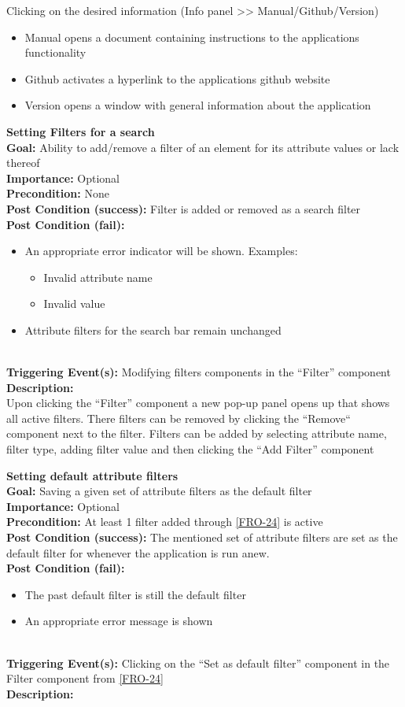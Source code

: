 \documentclass[10pt,a4paper]{report}
\newcommand{\precondition}[1]{
    \textbf{Precondition: } #1 \leavevmode \\
}
\newcommand{\FRDescription}[8]{
    \textbf{#1} \leavevmode \\
    \textbf{Goal: } #2 \leavevmode \\
    \textbf{Importance: } #3 \leavevmode \\
    \precondition{#4}
    \textbf{Post Condition (success): } #5 \leavevmode \\
    \textbf{Post Condition (fail): } #6 \leavevmode \\
    \textbf{Triggering Event(s): } #7 \leavevmode \\
    \textbf{Description: } \leavevmode \\ 
    #8}
\newcommand{\FRODescription}[8]{
    \textbf{#1} \leavevmode \\
    \textbf{Goal: } #2 \leavevmode \\
    \textbf{Importance: } #3 \leavevmode \\
    \precondition{#4}
    \textbf{Post Condition (success): } #5 \leavevmode \\
    \textbf{Post Condition (fail): } #6 \leavevmode \\
    \textbf{Triggering Event(s): } #7 \leavevmode \\
    \textbf{Description: } \leavevmode \\
    #8}
\begin{document}
\begin{FRO}
    {Clicking on the desired information (Info panel >> Manual/Github/Version)}
    {\begin{itemize}
        \item Manual opens a document containing instructions to the applications functionality
        \item Github activates a hyperlink to the applications github website
        \item Version opens a window with general information about the application
    \end{itemize}}
    \item \FRDescription{Setting Filters for a search}
    {Ability to add/remove a filter of an element for its attribute values or lack thereof}
    {Optional}
    {None}
    {Filter is added or removed as a search filter}
    {\begin{itemize}
        \item An appropriate error indicator will be shown. Examples:
        \begin{itemize}
            \item Invalid attribute name
            \item Invalid value
        \end{itemize}
        \item Attribute filters for the search bar remain unchanged
    \end{itemize}}
    {Modifying filters components in the “Filter” component}
    {Upon clicking the “Filter” component a new pop-up panel opens up that shows all active filters. There filters can be removed by clicking the “Remove“ component next to the filter. Filters can be added by selecting attribute name, filter type, adding filter value and then clicking the “Add Filter” component}
    \item \FRODescription{Setting default attribute filters}
    {Saving a given set of attribute filters as the default filter}
    {Optional}
    {At least 1 filter added through \ref{FRO-24} is active}
    {The mentioned set of attribute filters are set as the default filter for whenever the application is run anew.}
    {\begin{itemize}
        \item The past default filter is still the default filter
        \item An appropriate error message is shown
    \end{itemize}}
    {Clicking on the “Set as default filter” component in the Filter component from \ref{FRO-24}}
\end{FRO}
\end{document}
